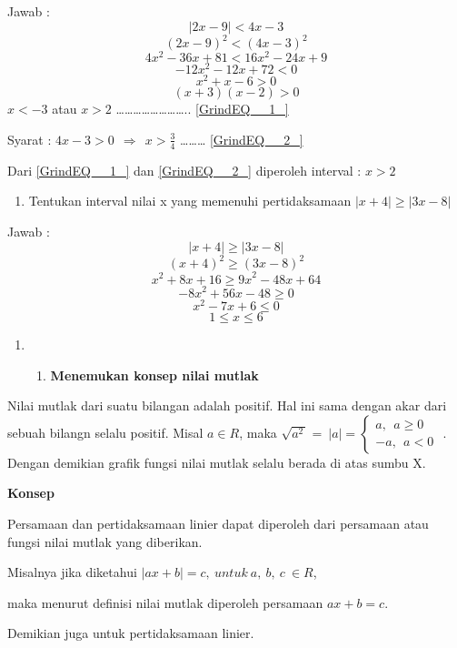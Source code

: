 \documentclass[11pt,fleqn]{book} %
\begin{document}
\noindent Jawab :
\[\left|2x-9\right|<4x-3\] 
\[{\left(2x-9\right)}^2<{\left(4x-3\right)}^2\] 
\[4x^2-36x+81<16x^2-24x+9\] 
\[-12x^2-12x+72<0\] 
\[x^2+x-6>0\] 
\[\left(x+3\right)\left(x-2\right)>0\] 
$x<-3$ atau $x>2$ {\dots}{\dots}{\dots}{\dots}{\dots}{\dots}{\dots}{\dots}.. \eqref{GrindEQ__1_}

\noindent Syarat : $4x-3>0\ \ \Longrightarrow \ \ x>\frac{3}{4}$  {\dots}{\dots}{\dots} \eqref{GrindEQ__2_}

\noindent Dari \eqref{GrindEQ__1_} dan \eqref{GrindEQ__2_} diperoleh interval : $x>2$

\begin{enumerate}
\item  Tentukan interval nilai x yang memenuhi pertidaksamaan $\left|x+4\right|\ge \left|3x-8\right|$
\end{enumerate}

\noindent Jawab :
\[\left|x+4\right|\ge \left|3x-8\right|\] 
\[{\left(x+4\right)}^2\ge {\left(3x-8\right)}^2\] 
\[x^2+8x+16\ge {9x}^2-48x+64\] 
\[{-8x}^2+56x-48\ge 0\] 
\[x^2-7x+6\le 0\] 
\[1\le x\le 6\] 


\noindent 

\begin{enumerate}
\item \begin{enumerate}
\item  \textbf{Menemukan konsep nilai mutlak}
\end{enumerate}
\end{enumerate}

\noindent Nilai mutlak dari suatu bilangan adalah positif. Hal ini sama dengan akar dari sebuah bilangn selalu positif. Misal $a\in R$, maka $\sqrt{a^{2\ }}=\ \left|a\right|=\left\{ \begin{array}{c}
a,\ \ a\ge 0 \\ 
-a,\ \ a<0 \end{array}
\right.$ . Dengan demikian grafik fungsi nilai mutlak selalu berada di atas sumbu X.

\textbf{Konsep}

\noindent Persamaan dan pertidaksamaan linier dapat diperoleh dari persamaan atau fungsi nilai mutlak yang diberikan. 

\noindent Misalnya jika diketahui $\left|ax+b\right|=c,\ untuk\ a,\ b,\ c\ \in R$, 

\noindent maka menurut definisi nilai mutlak  diperoleh persamaan $ax+b=c.$ 

\noindent Demikian juga untuk pertidaksamaan linier.
\end{document}
